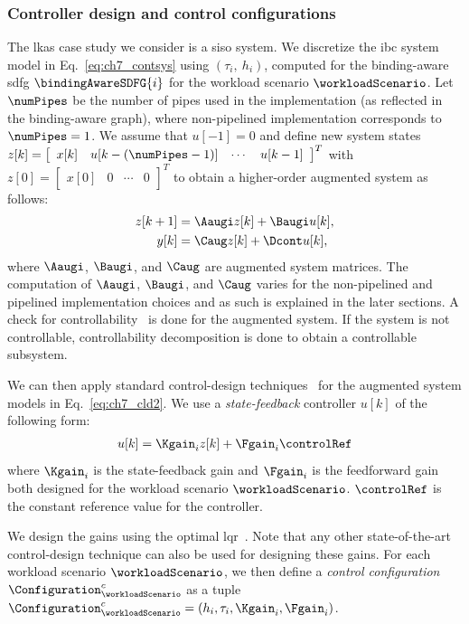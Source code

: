 \subsubsection{Controller design and control configurations}
\label{sec:ch7_control_configuration}
The \gls{lkas} case study we consider is a \gls{siso} system. 
We discretize the \gls{ibc} system model in Eq.~\ref{eq:ch7_contsys} using $(\tau_{i},\ h_{i})$, computed for the binding-aware \gls{sdfg} $\bindingAwareSDFG{i}$ for the workload scenario $\workloadScenario$. Let $\numPipes$ be the number of pipes used in the implementation (as reflected in the binding-aware graph), where non-pipelined implementation corresponds to $\numPipes=1$.
We assume that $u[-1]=0$ and define new system states $z[k]=\left[ \begin{array}{cccc} x[k] & u[k-(\numPipes-1)] & \cdots & u[k-1] \end{array} \right]^T$ with $z[0]=\left[ \begin{array}{cccc} x[0] & 0 & \cdots & 0 \end{array} \right]^T$ to obtain a higher-order augmented system as follows:
\begin{align}
\label{eq:ch7_cld2}
z[k+1] &= \Aaugi z[k] + \Baugi u[k], \nonumber\\
y[k]&= \Caug z[k] + \Dcont u[k], 
\vspace{-2mm}
\end{align}
where $\Aaugi$, $\Baugi$, and $\Caug$ are augmented system matrices. The computation of $\Aaugi$, $\Baugi$, and $\Caug$ varies for the non-pipelined and pipelined implementation choices and as such is explained in the later sections.
A check for controllability~\cite{dorf2011modern} is done for the augmented system.
If the system is not controllable, controllability decomposition is done to obtain a controllable subsystem.

We can then apply standard control-design techniques~\cite{dorf2011modern} for the augmented system models in Eq.~\ref{eq:ch7_cld2}.
We use a \emph{state-feedback} controller $u[k]$ of the following form:
 \begin{align}
		u[k] = \Kgain_{i} z[k] + \Fgain_{i} \controlRef
		\label{eqn:u}
 \end{align}
where $\Kgain_{i}$ is the state-feedback gain and $\Fgain_{i}$ is the feedforward gain both designed for the workload scenario $\workloadScenario$. $\controlRef$ is the constant reference value for the controller.

We design the gains using the optimal \gls{lqr}~\cite{dorf2011modern}. 
Note that any other state-of-the-art control-design technique can also be used for designing these gains.
For each workload scenario $\workloadScenario$, we then define a \emph{control configuration} $\Configuration_{\workloadScenario}^c$ as a tuple $\Configuration_{\workloadScenario}^c = (h_{i},\tau_{i}, \Kgain_{i}, \Fgain_{i})$.

